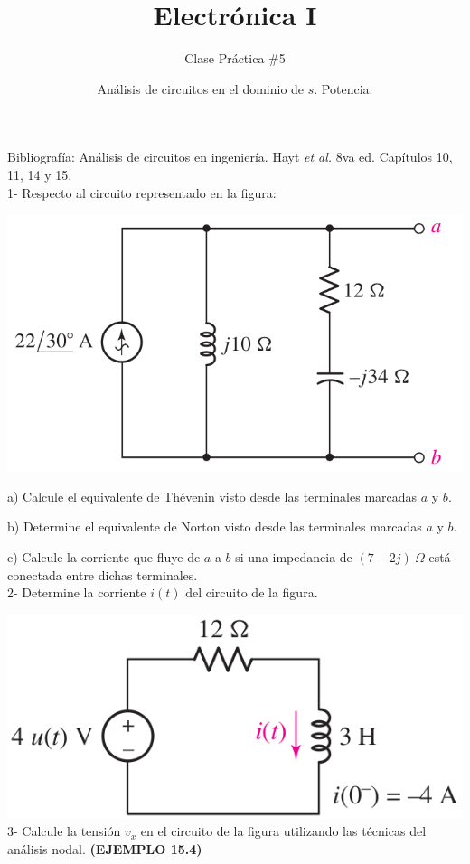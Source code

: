\documentclass[10pt,letterpaper]{article}
\author{Clase Práctica $\#$5}
\title{Electrónica I}
\date{Análisis de circuitos en el dominio de $s$. Potencia.}
\begin{document}
	\maketitle
	
Bibliografía: Análisis de circuitos en ingeniería. Hayt \textit{et al.} 8va ed. Capítulos 10, 11, 14 y 15.
\\
1- Respecto al circuito representado en la figura:

\includegraphics[scale=0.35]{c1} 

a) Calcule el equivalente de Thévenin visto desde las terminales marcadas $a$ y $b$.

b) Determine el equivalente de Norton visto desde las terminales marcadas $a$ y $b$.

c) Calcule la corriente que fluye de $a$ a $b$ si una impedancia de $(7-2j)\:\Omega$ está conectada entre dichas terminales. \\

2- Determine la corriente $i(t)$ del circuito de la figura.

\includegraphics[scale=0.45]{c2} \\

3- Calcule la tensión $v_x$ en el circuito de la figura utilizando las técnicas del análisis nodal. \textbf{(EJEMPLO 15.4)}
\end{document}
